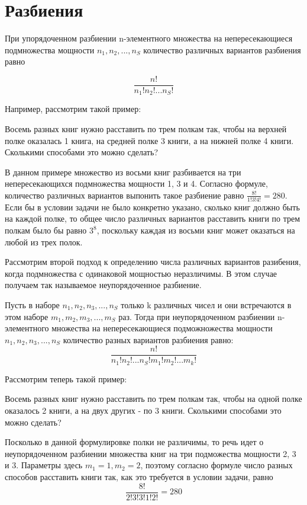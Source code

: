 \section{Разбиения}
\begin{utv}
    При упорядоченном разбиении n-элементного множества на непересекающиеся
подмножества мощности $n_1, n_2, ..., n_S$ количество различных вариантов разбиения равно
\end{utv}

\begin{equation}
    \frac{n!}{n_1!n_2!...n_S!}
\end{equation}

Например, рассмотрим такой пример:

Восемь разных книг нужно расставить по трем полкам так, чтобы на верхней полке
оказалась 1 книга, на средней полке 3 книги, а на нижней полке 4 книги. Сколькими способами
это можно сделать?

В данном примере множество из восьми книг разбивается на три непересекающихся подмножества
мощности 1, 3 и 4. Согласно формуле, количество различных вариантов выпонить такое разбиение
равно $\frac{8!}{1!3!4!}=280$. Если бы в условии задачи не было конкретно указано, 
сколько книг должно быть на каждой полке, то общее число различных вариантов расставить книги по трем
полкам было бы равно $3^8$, поскольку каждая из восьми книг может оказаться на любой из трех
полок.

Рассмотрим второй подход к определению числа различных вариантов разибения, когда подмножества
с одинаковой мощностью неразличимы. В этом случае получаем так называемое неупорядоченное разбиение.

\begin{utv}
    Пусть в наборе $n_1, n_2, n_3, ..., n_S$ только k различных чисел и они встречаются в этом наборе 
    $m_1, m_2, m_3, ..., m_S$ раз. Тогда при неупорядоченном разбиении n-элементного множества на непересекающиеся
    подможножества мощности $n_1, n_2, n_3, ..., n_S$ количество разных вариантов разбиения равно:
    \begin{equation}
        \frac{n!}{n_1!n_2!...n_S!m_1!m_2!...m_k!}
    \end{equation}
\end{utv}

Рассмотрим теперь такой пример:

Восемь разных книг нужно расставить по трем полкам так, чтобы на одной полке оказалось 2
книги, а на двух других - по 3 книги. Сколькими способами это можно сделать?

Посколько в данной формулировке полки не различимы, то речь идет о неупорядоченном разбиении
множества книг на три подможества мощности 2, 3 и 3. Параметры здесь $m_1 = 1, m_2 = 2$, 
поэтому согласно формуле число разных способов расставить книги так, как это требуется в условии задачи,
равно
\begin{equation*}
    \frac{8!}{2!3!3!1!2!} = 280
\end{equation*}